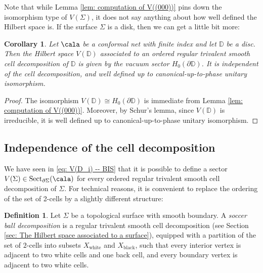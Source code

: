 \documentclass[a4paper,10pt,leqno]{amsart}
\newcommand{\ID}{\mathbb{D}}     \newcommand{\cald}{\mathcal{D}}
\theoremstyle{plain}
\newtheorem{corollary}[theorem]{Corollary}
\theoremstyle{definition}
\newtheorem{definition}[theorem]{Definition}
\theoremstyle{remark}
\DeclareMathOperator{\Rep}{Sect}
\begin{document}
Note that while Lemma \ref{lem: computation of V((000))} pins down the isomorphism type of $V(\Sigma)$, it does not say anything
about how well defined the Hilbert space is.
If the surface $\Sigma$ is a disk, then we can get a little bit more:

\begin{corollary}\label{cor: V(disc) independent of cell decomposition}
Let $\cala$ be a conformal net with finite index and let $\ID$ be a disc.
Then the Hilbert space $V(\ID)$ associated to an ordered regular trivalent smooth cell decomposition of $\ID$ is given by the vacuum sector $H_0(\partial \ID)$.
It is independent of the cell decomposition, and well defined up to canonical-up-to-phase unitary isomorphism.
\end{corollary}

\begin{proof}
The isomorphism $V(\ID)\cong H_0(\partial \ID)$ is immediate from Lemma \ref{lem: computation of V((000))}.
Moreover, by Schur's lemma, since $V(\ID)$ is irreducible, it is well defined up to canonical-up-to-phase unitary isomorphism.
\end{proof}



\subsection{Independence of the cell decomposition}\label{sec: Independence of the cell decomposition}

We have seen in \eqref{eq: V(D_i) -- BIS} that it is possible to define a sector $V(\Sigma)\in\Rep_{\partial \Sigma}(\cala)$ for every ordered regular trivalent smooth cell decomposition of $\Sigma$.
For technical reasons, it is convenient to replace the ordering of the set of 2-cells by a slightly different structure:

\begin{definition}
Let $\Sigma$ be a topological surface with smooth boundary.
A \emph{soccer ball decomposition} is a regular trivalent smooth cell decomposition (see Section \ref{sec: The Hilbert space associated to a surface}), equipped
with a partition of the set of $2$-cells into subsets $X_{\mathrm{white}}$ and $X_{\mathrm{black}}$, such that 
every interior vertex is adjacent to two white cells and one back cell, and every boundary vertex is adjacent to two white cells.
\end{definition}
\end{document}
